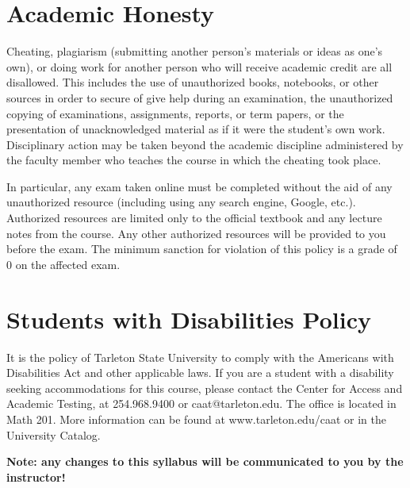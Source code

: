\documentclass[10pt]{article}
\begin{document}
\section*{Academic Honesty}
\label{sec-8}

Cheating, plagiarism (submitting another person’s materials or ideas as one’s own), or doing work for another person who will receive academic credit are all disallowed. This includes the use of unauthorized books, notebooks, or other sources in order to secure of give help during an examination, the unauthorized copying of examinations, assignments, reports, or term papers, or the presentation of unacknowledged material as if it were the student’s own work. Disciplinary action may be taken beyond the academic discipline administered by the faculty member who teaches the course in which the cheating took place.

In particular, any exam taken online must be completed without the aid of any unauthorized resource (including using any search engine, Google, etc.).  Authorized resources are limited only to the official textbook and any lecture notes from the course.  Any other authorized resources will be provided to you before the exam.  The minimum sanction for violation of this policy is a grade of 0 on the affected exam.

\section*{Students with Disabilities Policy}
\label{sec-9}

It is the policy of Tarleton State University to comply with the Americans with Disabilities Act and other applicable laws. If you are a student with a disability seeking accommodations for this course, please contact the Center for Access and Academic Testing, at 254.968.9400 or caat@tarleton.edu. The office is located in Math 201. More information can be found at www.tarleton.edu/caat or in the University Catalog.



\textbf{\textbf{Note:  any changes to this syllabus will be communicated to you by the instructor!}}
\end{document}
